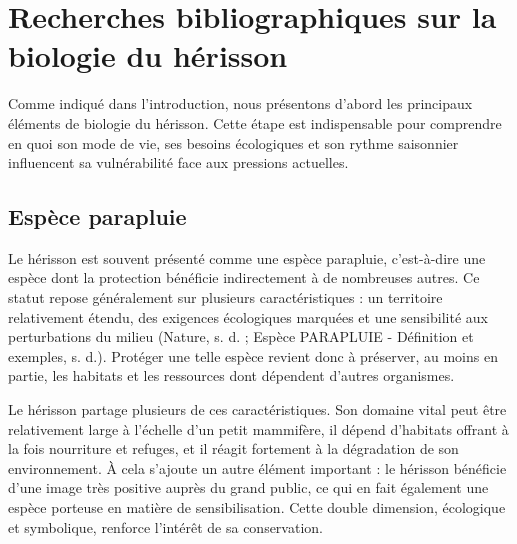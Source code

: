 \documentclass[a4paper,11pt]{article}
\begin{document}
\section{Recherches bibliographiques sur la biologie du hérisson}

Comme indiqué dans l’introduction, nous présentons d’abord les principaux éléments de biologie du hérisson. Cette étape est indispensable pour comprendre en quoi son mode de vie, ses besoins écologiques et son rythme saisonnier influencent sa vulnérabilité face aux pressions actuelles.

\subsection{Espèce parapluie}

Le hérisson est souvent présenté comme une espèce parapluie, c’est-à-dire une espèce dont la protection bénéficie indirectement à de nombreuses autres. Ce statut repose généralement sur plusieurs caractéristiques : un territoire relativement étendu, des exigences écologiques marquées et une sensibilité aux perturbations du milieu (Nature, s. d. ; Espèce PARAPLUIE - Définition et exemples, s. d.). Protéger une telle espèce revient donc à préserver, au moins en partie, les habitats et les ressources dont dépendent d’autres organismes.

Le hérisson partage plusieurs de ces caractéristiques. Son domaine vital peut être relativement large à l’échelle d’un petit mammifère, il dépend d’habitats offrant à la fois nourriture et refuges, et il réagit fortement à la dégradation de son environnement. À cela s’ajoute un autre élément important : le hérisson bénéficie d’une image très positive auprès du grand public, ce qui en fait également une espèce porteuse en matière de sensibilisation. Cette double dimension, écologique et symbolique, renforce l’intérêt de sa conservation.
\end{document}
